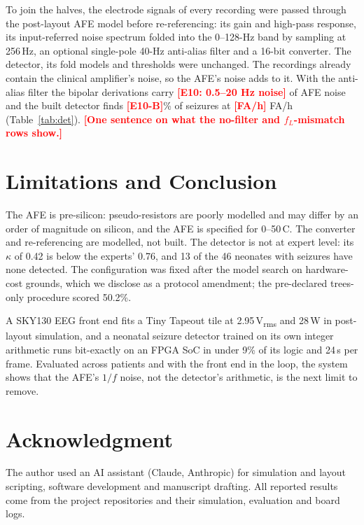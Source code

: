 \documentclass[conference]{IEEEtran}
\newcommand{\uVrms}{\,\textmu V\textsubscript{rms}}
\newcommand{\uW}{\,\textmu W}
\newcommand{\tbd}[1]{\textcolor{red}{\textbf{[#1]}}}
\newif\ifblind
\begin{document}
To join the halves, the electrode signals of every recording were passed through the post-layout AFE model before re-referencing: its gain and high-pass response, its input-referred noise spectrum folded into the 0--128-Hz band by sampling at 256\,Hz, an optional single-pole 40-Hz anti-alias filter and a 16-bit converter. The detector, its fold models and thresholds were unchanged. The recordings already contain the clinical amplifier's noise, so the AFE's noise adds to it. With the anti-alias filter the bipolar derivations carry \tbd{E10: 0.5--20 Hz noise} of AFE noise and the built detector finds \tbd{E10-B}\% of seizures at \tbd{FA/h} FA/h (Table~\ref{tab:det}). \tbd{One sentence on what the no-filter and $f_L$-mismatch rows show.}

\section{Limitations and Conclusion}

The AFE is pre-silicon: pseudo-resistors are poorly modelled and may differ by an order of magnitude on silicon, and the AFE is specified for 0--50\,\textdegree C. The converter and re-referencing are modelled, not built. The detector is not at expert level: its $\kappa$ of 0.42 is below the experts' 0.76, and 13 of the 46 neonates with seizures have none detected. The configuration was fixed after the model search on hardware-cost grounds, which we disclose as a protocol amendment; the pre-declared trees-only procedure scored 50.2\%.

A SKY130 EEG front end fits a Tiny Tapeout tile at 2.95\uVrms{} and 28\uW{} in post-layout simulation, and a neonatal seizure detector trained on its own integer arithmetic runs bit-exactly on an FPGA SoC in under 9\% of its logic and 24\,\textmu s per frame. Evaluated across patients and with the front end in the loop, the system shows that the AFE's $1/f$ noise, not the detector's arithmetic, is the next limit to remove.

\section*{Acknowledgment}

\ifblind An AI assistant (Claude, Anthropic) was used\else The author used an AI assistant (Claude, Anthropic)\fi{} for simulation and layout scripting, software development and manuscript drafting. All reported results come from the project repositories and their simulation, evaluation and board logs.



\end{document}
